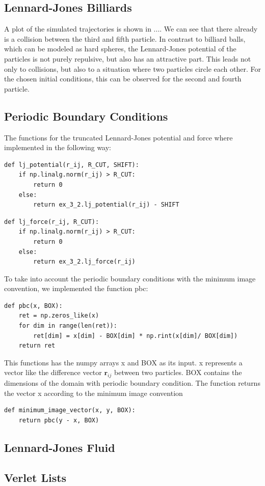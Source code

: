 \documentclass[a4paper,10pt,bibtotoc]{scrartcl}
\begin{document}
\subsection{Lennard-Jones Billiards}
A plot of the simulated trajectories is shown in .... 
We can see that there already is a collision between the third and fifth particle. 
In contrast to billiard balls, which can be modeled as hard spheres, the Lennard-Jones potential of the particles is not purely repulsive, but also has an attractive part. 
This leads not only to collisions, but also to a situation where two particles circle each other.
For the chosen initial conditions, this can be observed for the second and fourth particle.

\subsection{Periodic Boundary Conditions}
The functions for the truncated Lennard-Jones potential and force where implemented in the following way:
\begin{lstlisting}
def lj_potential(r_ij, R_CUT, SHIFT):
    if np.linalg.norm(r_ij) > R_CUT:
        return 0
    else:
        return ex_3_2.lj_potential(r_ij) - SHIFT
\end{lstlisting}

\begin{lstlisting}
def lj_force(r_ij, R_CUT):
    if np.linalg.norm(r_ij) > R_CUT:
        return 0
    else:
        return ex_3_2.lj_force(r_ij)
\end{lstlisting}
To take into account the periodic boundary conditions with the minimum image convention, we implemented the function pbc:
\begin{lstlisting}
def pbc(x, BOX):
    ret = np.zeros_like(x)
    for dim in range(len(ret)):
        ret[dim] = x[dim] - BOX[dim] * np.rint(x[dim]/ BOX[dim])
    return ret
\end{lstlisting}
This functions has the numpy arrays x and BOX as its input.
x represents a vector like the difference vector $\mathbf{r}_{ij}$ between two particles. 
BOX contains the dimensions of the domain with periodic boundary condition.
The function returns the vector x according to the minimum image convention

\begin{lstlisting}
def minimum_image_vector(x, y, BOX):
    return pbc(y - x, BOX)
\end{lstlisting}




\subsection{Lennard-Jones Fluid}
\subsection{Verlet Lists}
\end{document}
